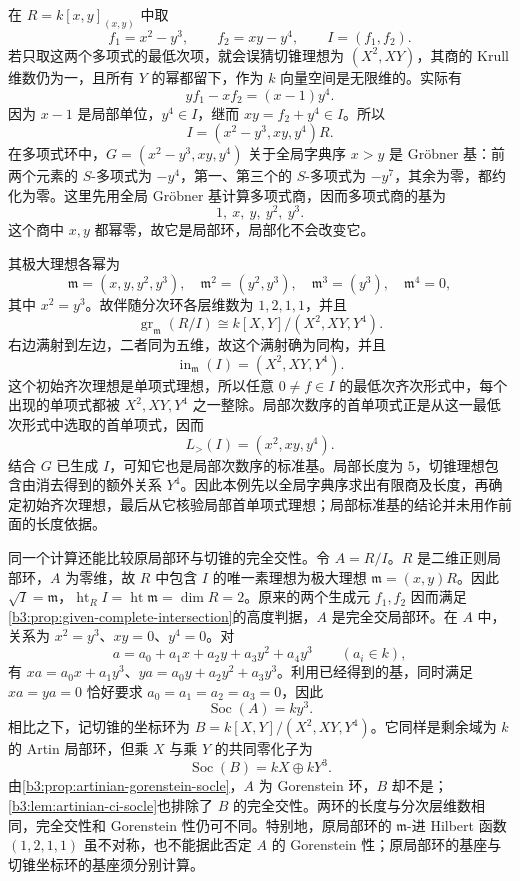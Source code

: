 \begin{example}\label{b3:exm:F-two-equations}
	在 \(R=k[x,y]_{(x,y)}\) 中取
	\[
		f_1=x^2-y^3,\qquad f_2=xy-y^4,\qquad I=(f_1,f_2).
	\]
	若只取这两个多项式的最低次项，就会误猜切锥理想为 \((X^2,XY)\)，其商的 Krull 维数仍为一，且所有 \(Y\) 的幂都留下，作为 \(k\) 向量空间是无限维的。实际有
	\[
		yf_1-xf_2=(x-1)y^4.
	\]
	因为 \(x-1\) 是局部单位，\(y^4\in I\)，继而 \(xy=f_2+y^4\in I\)。所以
	\[
		I=(x^2-y^3,xy,y^4)R.
	\]
	在多项式环中，\(G=(x^2-y^3,xy,y^4)\) 关于全局字典序 \(x>y\) 是 Gröbner 基：前两个元素的 \(S\)-多项式为 \(-y^4\)，第一、第三个的 \(S\)-多项式为 \(-y^7\)，其余为零，都约化为零。这里先用全局 Gröbner 基计算多项式商，因而多项式商的基为
	\[
		1,\ x,\ y,\ y^2,\ y^3.
	\]
	这个商中 \(x,y\) 都幂零，故它是局部环，局部化不会改变它。

	\ProseParagraphBreak
	其极大理想各幂为
	\[
		\mathfrak m=(x,y,y^2,y^3),\quad \mathfrak m^2=(y^2,y^3),\quad \mathfrak m^3=(y^3),\quad \mathfrak m^4=0,
	\]
	其中 \(x^2=y^3\)。故伴随分次环各层维数为 \(1,2,1,1\)，并且
	\[
		\operatorname{gr}_{\mathfrak m}(R/I) \cong k[X,Y]/(X^2,XY,Y^4).
	\]
	右边满射到左边，二者同为五维，故这个满射确为同构，并且
	\[
		\operatorname{in}_{\mathfrak m}(I)=(X^2,XY,Y^4).
	\]
	这个初始齐次理想是单项式理想，所以任意 \(0\ne f\in I\) 的最低次齐次形式中，每个出现的单项式都被 \(X^2,XY,Y^4\) 之一整除。局部次数序的首单项式正是从这一最低次形式中选取的首单项式，因而
	\[
		L_{>}(I)=(x^2,xy,y^4).
	\]
	结合 \(G\) 已生成 \(I\)，可知它也是局部次数序的标准基。局部长度为 \(5\)，切锥理想包含由消去得到的额外关系 \(Y^4\)。因此本例先以全局字典序求出有限商及长度，再确定初始齐次理想，最后从它核验局部首单项式理想；局部标准基的结论并未用作前面的长度依据。

	\ProseParagraphBreak
	同一个计算还能比较原局部环与切锥的完全交性。令 \(A=R/I\)。\(R\) 是二维正则局部环，\(A\) 为零维，故 \(R\) 中包含 \(I\) 的唯一素理想为极大理想 \(\mathfrak m=(x,y)R\)。因此 \(\sqrt I=\mathfrak m\)，\(\operatorname{ht}_R I=\operatorname{ht}\mathfrak m=\dim R=2\)。原来的两个生成元 \(f_1,f_2\) 因而满足\cref{b3:prop:given-complete-intersection}的高度判据，\(A\) 是完全交局部环。在 \(A\) 中，关系为 \(x^2=y^3\)、\(xy=0\)、\(y^4=0\)。对
	\[
		a=a_0+a_1x+a_2y+a_3y^2+a_4y^3\qquad(a_i\in k),
	\]
	有 \(xa=a_0x+a_1y^3\)、\(ya=a_0y+a_2y^2+a_3y^3\)。利用已经得到的基，同时满足 \(xa=ya=0\) 恰好要求 \(a_0=a_1=a_2=a_3=0\)，因此
	\[
		\operatorname{Soc}(A)=ky^3.
	\]
	相比之下，记切锥的坐标环为 \(B=k[X,Y]/(X^2,XY,Y^4)\)。它同样是剩余域为 \(k\) 的 Artin 局部环，但乘 \(X\) 与乘 \(Y\) 的共同零化子为
	\[
		\operatorname{Soc}(B)=kX\oplus kY^3.
	\]
	由\cref{b3:prop:artinian-gorenstein-socle}，\(A\) 为 Gorenstein 环，\(B\) 却不是；\cref{b3:lem:artinian-ci-socle}也排除了 \(B\) 的完全交性。两环的长度与分次层维数相同，完全交性和 Gorenstein 性仍可不同。特别地，原局部环的 \(\mathfrak m\)-进 Hilbert 函数 \((1,2,1,1)\) 虽不对称，也不能据此否定 \(A\) 的 Gorenstein 性；原局部环的基座与切锥坐标环的基座须分别计算。
\end{example}

